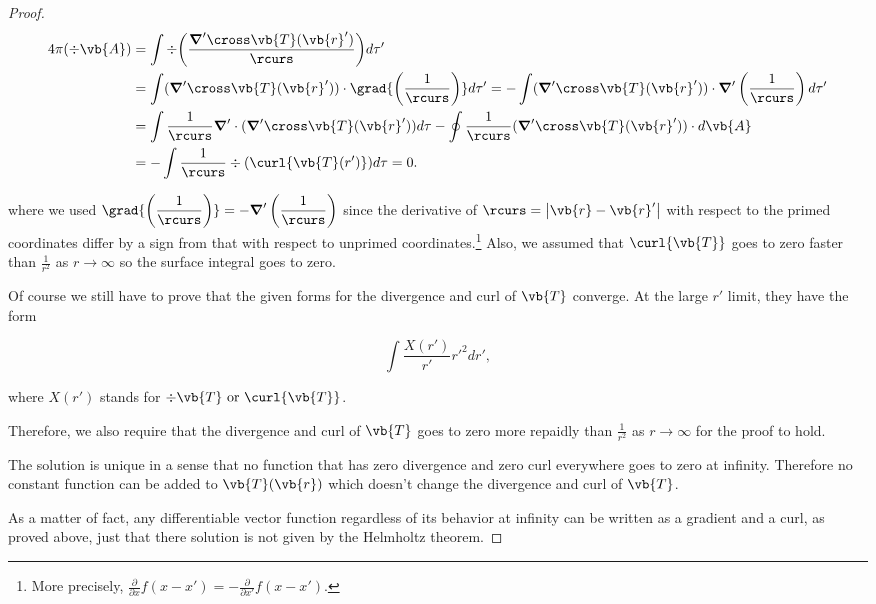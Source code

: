 \documentclass[english,a4paper,12pt]{report}
\begin{document}
\begin{proof}
\begin{equation}
	\begin{aligned}
		4\pi (\div{\vb{A} } ) &= \int \div{\left(\frac{\boldsymbol{\nabla}' \cross \vb{T} (\vb{r} ')}{\rcurs }\right)} d\tau ' \\ 
		&= \int (\boldsymbol{\nabla}' \cross \vb{T} (\vb{r} ')) \cdot \grad{\left(\frac{1}{\rcurs } \right)} d\tau ' = -\int (\boldsymbol{\nabla}' \cross \vb{T} (\vb{r} ')) \cdot \boldsymbol{\nabla}'\left(\frac{1}{\rcurs } \right) d\tau ' \\
		&= \int \frac{1}{\rcurs }\boldsymbol{\nabla}' \cdot (\boldsymbol{\nabla}' \cross \vb{T} (\vb{r} ')) d\tau  - \oint \frac{1}{\rcurs } (\boldsymbol{\nabla}' \cross \vb{T} (\vb{r} ')) \cdot d\vb{A}  \\
        &= - \int \frac{1}{\rcurs } \div{(\curl{\vb{T} (r')} )} d\tau = 0.  	
	\end{aligned}
\end{equation}

where we used \(\displaystyle \grad{\left(\frac{1}{\rcurs } \right)} = - \boldsymbol{\nabla}'\left(\frac{1}{\rcurs } \right) \) since the derivative of \(\rcurs = \left| \vb{r} - \vb{r} ' \right| \) with respect to the primed coordinates differ by a sign from that with respect to unprimed coordinates.\footnote{More precisely, \(\frac{\partial }{\partial x} f(x-x') = - \frac{\partial }{\partial x'} f(x-x')\).} Also, we assumed that \(\curl{\vb{T} } \) goes to zero faster than \(\displaystyle \frac{1}{r^2} \) as \(r \to  \infty\) so the surface integral goes to zero.    

Of course we still have to prove that the given forms for the divergence and curl of \(\vb{T} \) converge. At the large \(r'\) limit, they have the form

\begin{equation}
	\int \frac{X(r')}{r'}r'^2 dr', 
\end{equation}

where \(X(r')\) stands for \(\div{\vb{T} } \text { or } \curl{\vb{T} }\).   

Therefore, we also require that the divergence and curl of \(\vb{T} \) goes to zero more repaidly than \(\displaystyle \frac{1}{r^2} \) as \(r \to  \infty\) for the proof to hold. 

The solution is unique in a sense that no function that has zero divergence and zero curl everywhere goes to zero at infinity. Therefore no constant function can be added to \(\vb{T} (\vb{r} )\) which doesn't change the divergence and curl of \(\vb{T} \). 

As a matter of fact, any differentiable vector function regardless of its behavior at infinity can be written as a gradient and a curl, as proved above, just that there solution is not given by the Helmholtz theorem.

\end{proof}
\end{document}
